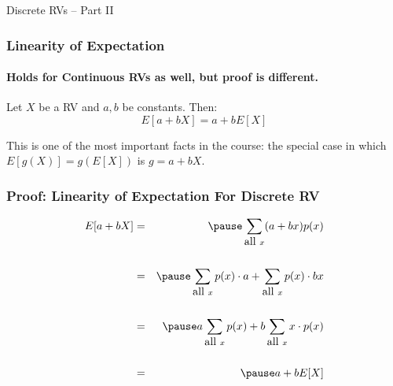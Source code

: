 \documentclass[handout]{beamer}
\date{Lecture \# 9}
\begin{document}
 


\begin{frame}[plain]
	\titlepage 
	

\end{frame} 


\begin{frame}
\centering \Huge Discrete RVs -- Part II

\end{frame}




\begin{frame}
\frametitle{Linearity of Expectation}
\framesubtitle{Holds for Continuous RVs as well, but proof is different.}
Let $X$ be a RV and $a,b$ be constants. Then:
	$$E[a + bX] = a + bE[X]$$
\vspace{2em}
\begin{alertblock}{This is one of the most important facts in the course: the special case in which $E[g(X)] = g(E[X])$ is $g = a+bX$.}
\end{alertblock}
\end{frame}
\begin{frame}
\frametitle{Proof: Linearity of Expectation For Discrete RV}

\begin{eqnarray*}
	E[a + bX] &=& \pause \sum_{\mbox{all } x}  (a + bx) p(x)\\ \\
	 &=&\pause  \sum_{\mbox{all } x} p(x) \cdot a + \sum_{\mbox{all } x}p(x) \cdot bx\\ \\
	&=& \pause a\sum_{\mbox{all } x} p(x) + b\sum_{\mbox{all } x} x \cdot p(x) \\ \\
	&=& \pause a + b E[X]
\end{eqnarray*}


\end{frame}
\end{document}
